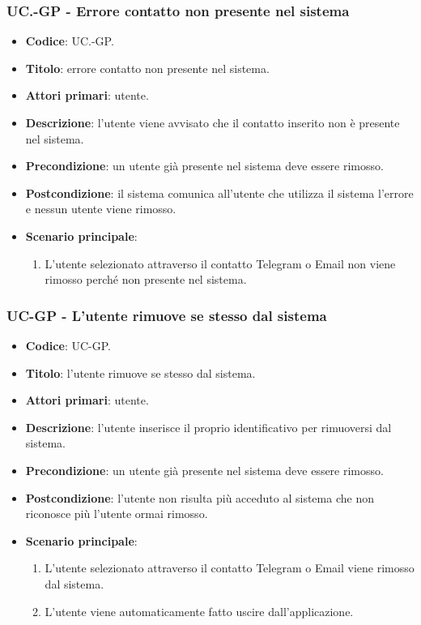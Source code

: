 			\subsubsection{UC\theuccount.\thesubuccount-GP - Errore contatto non presente nel sistema}
					
				\begin{itemize}
					\item \textbf{Codice}: UC\theuccount.\thesubuccount-GP.
					\item \textbf{Titolo}: errore contatto non presente nel sistema.
					\item \textbf{Attori primari}: utente.
					\item \textbf{Descrizione}: l’utente viene avvisato che il contatto inserito non è presente nel sistema.
					\item \textbf{Precondizione}: un utente già presente nel sistema deve essere rimosso.
					\item \textbf{Postcondizione}: il sistema comunica all’utente che utilizza il sistema l’errore e nessun utente viene rimosso.
					\item \textbf{Scenario principale}:
					\begin{enumerate}
						\item L'utente selezionato attraverso il contatto Telegram o Email non viene rimosso perché non presente nel sistema.
					\end{enumerate}
				\end{itemize}
			
			\subsubsection{UC\theuccount-GP - L'utente rimuove se stesso dal sistema}
			
			\begin{itemize}
				\item \textbf{Codice}: UC\theuccount-GP.
				\item \textbf{Titolo}: l'utente rimuove se stesso dal sistema.
				\item \textbf{Attori primari}: utente.
				\item \textbf{Descrizione}:  l’utente inserisce il proprio identificativo per rimuoversi dal sistema.
				\item \textbf{Precondizione}: un utente già presente nel sistema deve essere rimosso.
				\item \textbf{Postcondizione}: l'utente non risulta più acceduto al sistema che non riconosce più l'utente ormai rimosso.
				\item \textbf{Scenario principale}:
				\begin{enumerate}
					\item L'utente selezionato attraverso il contatto Telegram o Email viene rimosso dal sistema.
					\item L'utente viene automaticamente fatto uscire dall'applicazione.
				\end{enumerate}
			\end{itemize}